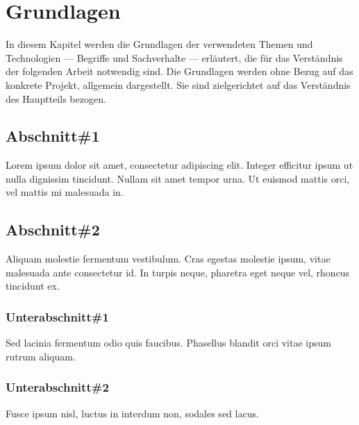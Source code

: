 \chapter{Grundlagen}

In diesem Kapitel werden die Grundlagen der verwendeten Themen und Technologien --- Begriffe und Sachverhalte --- erläutert, die für das Verständnis der folgenden Arbeit notwendig sind.
Die Grundlagen werden ohne Bezug auf das konkrete Projekt, allgemein dargestellt. Sie sind zielgerichtet auf das Verständnis des Hauptteils bezogen.


\section{Abschnitt\#1}

Lorem ipsum dolor sit amet, consectetur adipiscing elit. Integer efficitur ipsum ut nulla dignissim tincidunt. Nullam sit amet tempor urna. Ut euismod mattis orci, vel mattis mi malesuada in. 

\section{Abschnitt\#2}

Aliquam molestie fermentum vestibulum. Cras egestas molestie ipsum, vitae malesuada ante consectetur id. In turpis neque, pharetra eget neque vel, rhoncus tincidunt ex. 


\subsection{Unterabschnitt\#1}

Sed lacinia fermentum odio quis faucibus. Phasellus blandit orci vitae ipsum rutrum aliquam. 

\subsection{Unterabschnitt\#2}

Fusce ipsum nisl, luctus in interdum non, sodales sed lacus. 


